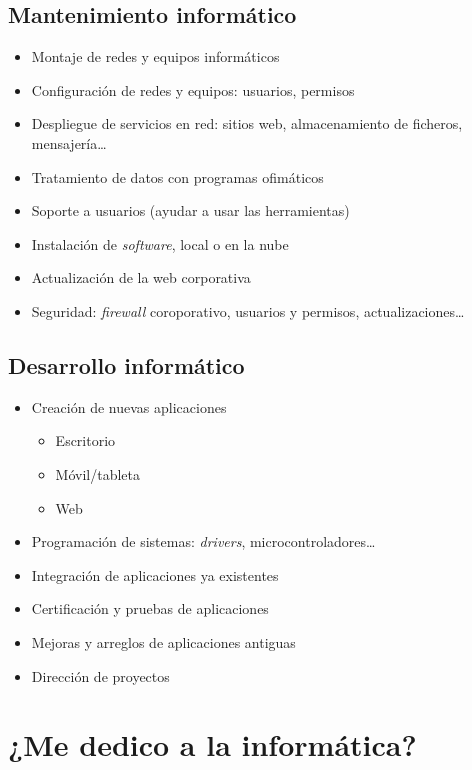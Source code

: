 \documentclass{article}
\begin{document}
\subsection{Mantenimiento informático}
\label{sec:org0000006}
\begin{itemize}
\item Montaje de redes y equipos informáticos
\item Configuración de redes y equipos: usuarios, permisos
\item Despliegue de servicios en red: sitios web, almacenamiento de ficheros, mensajería\ldots{}
\item Tratamiento de datos con programas ofimáticos
\item Soporte a usuarios (ayudar a usar las herramientas)
\item Instalación de \emph{software}, local o en la nube
\item Actualización de la web corporativa
\item Seguridad: \emph{firewall} coroporativo, usuarios y permisos, actualizaciones\ldots{}
\end{itemize}

\subsection{Desarrollo informático}
\label{sec:org0000009}
\begin{itemize}
\item Creación de nuevas aplicaciones
\begin{itemize}
\item Escritorio
\item Móvil/tableta
\item Web
\end{itemize}
\item Programación de sistemas: \emph{drivers}, microcontroladores\ldots{}
\item Integración de aplicaciones ya existentes
\item Certificación y pruebas de aplicaciones
\item Mejoras y arreglos de aplicaciones antiguas
\item Dirección de proyectos
\end{itemize}

\section{¿Me dedico a la informática?}
\label{sec:org0000018}
\end{document}
